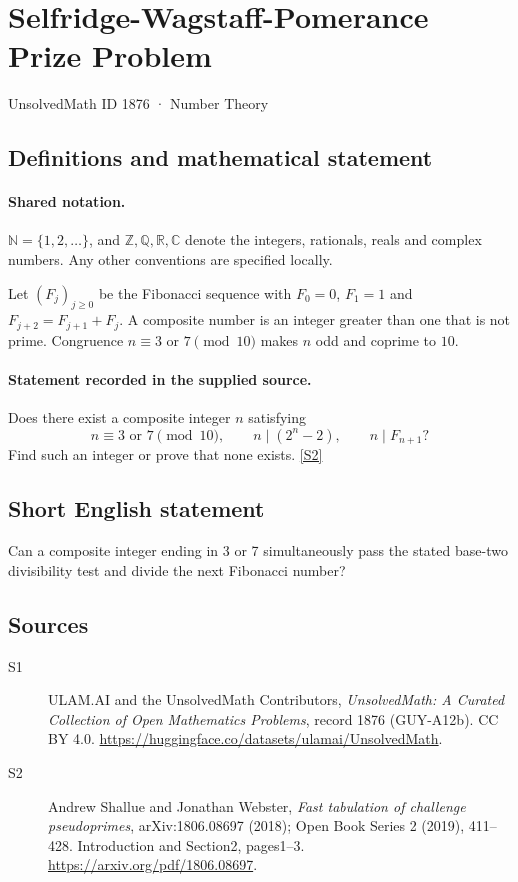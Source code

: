 \documentclass[11pt]{book}
\newcommand{\sref}[2]{\hyperlink{source:#1:#2}{[S#2]}}
\begin{document}
\setcounter{section}{1875}
\section{Selfridge-Wagstaff-Pomerance Prize Problem}\label{1876}
{\small\sffamily UnsolvedMath ID 1876 · Number Theory}
\subsection{Definitions and mathematical statement}

\paragraph{Shared notation.}$\mathbb N=\{1,2,\ldots\}$, and $\mathbb Z,\mathbb Q,\mathbb R,\mathbb C$ denote the integers, rationals, reals and complex numbers. Any other conventions are specified locally.


Let $(F_j)_{j\geq0}$ be the Fibonacci sequence with $F_0=0$, $F_1=1$ and $F_{j+2}=F_{j+1}+F_j$. A composite number is an integer greater than one that is not prime. Congruence $n\equiv3\text{ or }7\pmod{10}$ makes $n$ odd and coprime to $10$.
\paragraph{Statement recorded in the supplied source.}
Does there exist a composite integer $n$ satisfying
\[n\equiv3\text{ or }7\pmod{10},\qquad n\mid(2^n-2),\qquad n\mid F_{n+1}?\]
Find such an integer or prove that none exists. \sref{1876}{2}
\subsection{Short English statement}
Can a composite integer ending in 3 or 7 simultaneously pass the stated base-two divisibility test and divide the next Fibonacci number?
\subsection{Sources}
\begin{description}
\item[\hypertarget{source:1876:1}{S1}] ULAM.AI and the UnsolvedMath Contributors, \emph{UnsolvedMath: A Curated Collection of Open Mathematics Problems}, record 1876 (GUY-A12b). CC BY 4.0. \url{https://huggingface.co/datasets/ulamai/UnsolvedMath}.
\item[\hypertarget{source:1876:2}{S2}] Andrew Shallue and Jonathan Webster, \emph{Fast tabulation of challenge pseudoprimes}, arXiv:1806.08697 (2018); Open Book Series 2 (2019), 411--428. Introduction and Section2, pages1--3. \url{https://arxiv.org/pdf/1806.08697}.
\end{description}
\label{end:1876}
\end{document}
